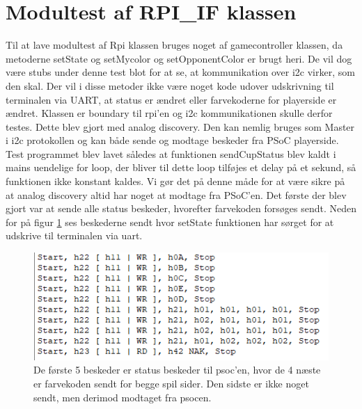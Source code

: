 \documentclass[Modultest/Modultest_main.tex]{subfiles}
\begin{document}
\section{Modultest af RPI\_IF klassen}\label{sec:RPIIFmodultestbilag}
Til at lave modultest af Rpi klassen bruges noget af gamecontroller klassen, da metoderne setState og setMycolor og setOpponentColor er brugt heri. De vil dog være stubs under denne test blot for at se, at kommunikation over i2c virker, som den skal. Der vil i disse metoder ikke være noget kode udover udskrivning til terminalen via UART, at status er ændret eller farvekoderne for playerside er ændret. 
Klassen er boundary til rpi'en og i2c kommunikationen skulle derfor testes. Dette blev gjort med analog discovery. Den kan nemlig bruges som Master i i2c protokollen og kan både sende og modtage beskeder fra PSoC playerside. Test programmet blev lavet således at funktionen sendCupStatus blev kaldt i mains uendelige for loop, der bliver til dette loop tilføjes et delay på et sekund, så funktionen ikke konstant kaldes. Vi gør det på denne måde for at være sikre på at analog discovery altid har noget at modtage fra PSoC'en. Det første der blev gjort var at sende alle status beskeder, hvorefter farvekoden forsøges sendt. Neden for på figur \ref{fig:analog_beskeder} ses beskederne sendt hvor setState funktionen har sørget for at udskrive til terminalen via uart.
\begin{figure}
    \centering 
    \includegraphics[width=\linewidth]{Modultest/RPI_IF/graphic/analog_beskeder.PNG}
    \caption{De første 5 beskeder er status beskeder til psoc'en, hvor de 4 næste er farvekoden sendt for begge spil sider. Den sidste er ikke noget sendt, men derimod modtaget fra psocen.}
    \label{fig:analog_beskeder}
\end{figure}
\end{document}
